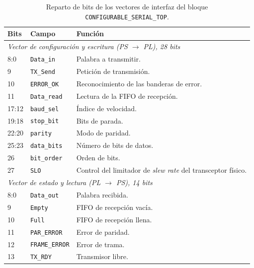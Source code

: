 \begin{table}[H]
    \centering
    \begin{tabular}{llp{}}
        \hline
        \textbf{Bits} & \textbf{Campo} & \textbf{Función} \\
        \hline
        \multicolumn{3}{l}{\textit{Vector de configuración y escritura (PS $\rightarrow$ PL), 28 bits}} \\
        \hline
        8:0   & \texttt{Data\_in}   & Palabra a transmitir. \\
        9     & \texttt{TX\_Send}   & Petición de transmisión. \\
        10    & \texttt{ERROR\_OK}  & Reconocimiento de las banderas de error. \\
        11    & \texttt{Data\_read} & Lectura de la FIFO de recepción. \\
        17:12 & \texttt{baud\_sel}  & Índice de velocidad. \\
        19:18 & \texttt{stop\_bit}  & Bits de parada. \\
        22:20 & \texttt{parity}     & Modo de paridad. \\
        25:23 & \texttt{data\_bits} & Número de bits de datos. \\
        26    & \texttt{bit\_order} & Orden de bits. \\
        27    & \texttt{SLO}        & Control del limitador de \textit{slew rate} del transceptor
                                      físico. \\
        \hline
        \multicolumn{3}{l}{\textit{Vector de estado y lectura (PL $\rightarrow$ PS), 14 bits}} \\
        \hline
        8:0   & \texttt{Data\_out}    & Palabra recibida. \\
        9     & \texttt{Empty}        & FIFO de recepción vacía. \\
        10    & \texttt{Full}         & FIFO de recepción llena. \\
        11    & \texttt{PAR\_ERROR}   & Error de paridad. \\
        12    & \texttt{FRAME\_ERROR} & Error de trama. \\
        13    & \texttt{TX\_RDY}      & Transmisor libre. \\
        \hline
    \end{tabular}
    \caption[Reparto de bits de los vectores de interfaz]{Reparto de bits de los vectores de
    interfaz del bloque \texttt{CONFIGURABLE\_SERIAL\_TOP}.}
    \label{tab:mapa_bits_top}
\end{table}

